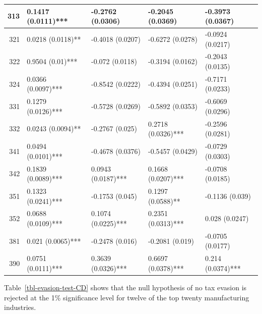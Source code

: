\documentclass[
  12pt]{article}
\theoremstyle{definition}
\theoremstyle{remark}
\begin{document}
\begin{table}
{\begin{tabular}[t]{r|l|l|l|l}
\hspace{1em}313 & 0.1417 (0.0111)*** & -0.2762 (0.0306) & -0.2045 (0.0369) & -0.3973 (0.0367)\\
\hline
\hspace{1em}321 & 0.0218 (0.0118)** & -0.4018 (0.0207) & -0.6272 (0.0278) & -0.0924 (0.0217)\\
\hline
\hspace{1em}322 & 0.9504 (0.01)*** & -0.072 (0.0118) & -0.3194 (0.0162) & -0.2043 (0.0135)\\
\hline
\hspace{1em}324 & 0.0366 (0.0097)*** & -0.8542 (0.0222) & -0.4394 (0.0251) & -0.7171 (0.0233)\\
\hline
\hspace{1em}331 & 0.1279 (0.0126)*** & -0.5728 (0.0269) & -0.5892 (0.0353) & -0.6069 (0.0296)\\
\hline
\hspace{1em}332 & 0.0243 (0.0094)** & -0.2767 (0.025) & 0.2718 (0.0326)*** & -0.2596 (0.0281)\\
\hline
\hspace{1em}341 & 0.0494 (0.0101)*** & -0.4678 (0.0376) & -0.5457 (0.0429) & -0.0729 (0.0303)\\
\hline
\hspace{1em}342 & 0.1839 (0.0089)*** & 0.0943 (0.0187)*** & 0.1668 (0.0207)*** & -0.0708 (0.0185)\\
\hline
\hspace{1em}351 & 0.1323 (0.0241)*** & -0.1753 (0.045) & 0.1297 (0.0588)** & -0.1136 (0.039)\\
\hline
\hspace{1em}352 & 0.0688 (0.0109)*** & 0.1074 (0.0225)*** & 0.2351 (0.0313)*** & 0.028 (0.0247)\\
\hline
\hspace{1em}381 & 0.021 (0.0065)*** & -0.2478 (0.016) & -0.2081 (0.019) & -0.0705 (0.0177)\\
\hline
\hspace{1em}390 & 0.0751 (0.0111)*** & 0.3639 (0.0326)*** & 0.6697 (0.0378)*** & 0.214 (0.0374)***\\
\hline
\end{tabular}

}

\end{table}%

Table~\ref{tbl-evasion-test-CD} shows that the null hypothesis of no tax
evasion is rejected at the 1\% significance level for twelve of the top
twenty manufacturing industries.
\end{document}
